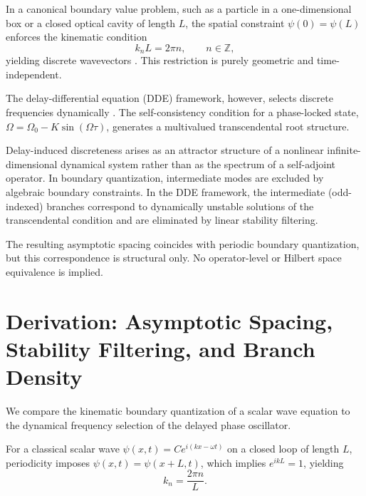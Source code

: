 \documentclass[11pt,a4paper]{article}
\begin{document}
        In a canonical boundary value problem, such as a particle in a one-dimensional box or a closed optical cavity of length $L$, the spatial constraint $\psi(0)=\psi(L)$ enforces the kinematic condition
        \begin{equation}
            k_n L = 2\pi n, \qquad n\in\mathbb{Z},
            \label{eq:kinematic_condition}
        \end{equation}
        yielding discrete wavevectors \cite{Griffiths2018,Siegman1986}. This restriction is purely geometric and time-independent.

        The delay-differential equation (DDE) framework, however, selects discrete frequencies dynamically \cite{Hale1993,Diekmann1995,Erneux2009}.
        The self-consistency condition for a phase-locked state, $\Omega = \Omega_0 - K \sin(\Omega \tau)$, generates a multivalued transcendental root structure.

        Delay-induced discreteness arises as an attractor structure of a nonlinear infinite-dimensional dynamical system rather than as the spectrum of a self-adjoint operator.
        In boundary quantization, intermediate modes are excluded by algebraic boundary constraints.
        In the DDE framework, the intermediate (odd-indexed) branches correspond to dynamically unstable solutions of the transcendental condition and are eliminated by linear stability filtering.

        The resulting asymptotic spacing coincides with periodic boundary quantization, but this correspondence is structural only.
        No operator-level or Hilbert space equivalence is implied.

    \section{Derivation: Asymptotic Spacing, Stability Filtering, and Branch Density}

        We compare the kinematic boundary quantization of a scalar wave equation to the dynamical frequency selection of the delayed phase oscillator.

        For a classical scalar wave $\psi(x,t) = C e^{i(kx-\omega t)}$ on a closed loop of length $L$, periodicity imposes $\psi(x,t)=\psi(x+L,t)$, which implies $e^{ikL}=1$, yielding
        \begin{equation}
            k_n=\frac{2\pi n}{L}.
            \label{eq:k_n}
        \end{equation}
\end{document}
